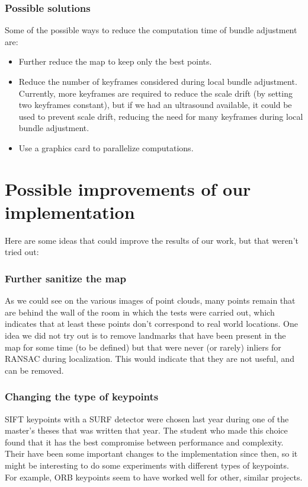 \subsubsection{Possible solutions}
Some of the possible ways to reduce the computation time of bundle adjustment are:
\begin{itemize}
\item Further reduce the map to keep only the best points.
\item Reduce the number of keyframes considered during local bundle adjustment. Currently, more keyframes are required to reduce the scale drift (by setting two keyframes constant), but if we had an ultrasound available, it could be used to prevent scale drift, reducing the need for many keyframes during local bundle adjustment.
\item Use a graphics card to parallelize computations.
\end{itemize}

\section{Possible improvements of our implementation}
Here are some ideas that could improve the results of our work, but that weren't tried out:

\subsubsection{Further sanitize the map}
As we could see on the various images of point clouds, many points remain that are behind the wall of the room in which the tests were carried out, which indicates that at least these points don't correspond to real world locations. One idea we did not try out is to remove landmarks that have been present in the map for some time (to be defined) but that were never (or rarely) inliers for RANSAC during localization. This would indicate that they are not useful, and can be removed.

\subsubsection{Changing the type of keypoints}
SIFT keypoints with a SURF detector were chosen last year during one of the master's theses that was written that year. The student who made this choice found that it has the best compromise between performance and complexity. Their have been some important changes to the implementation since then, so it might be interesting to do some experiments with different types of keypoints. For example, ORB keypoints seem to have worked well for other, similar projects.

